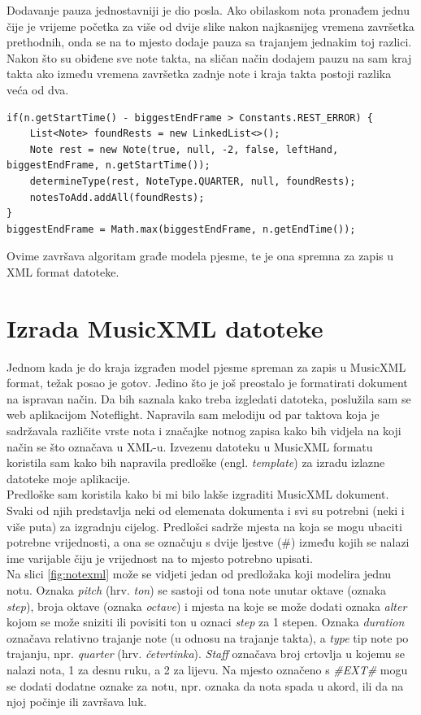 \documentclass[times, utf8, zavrsni, numeric]{fer}
\begin{document}
Dodavanje pauza jednostavniji je dio posla. Ako obilaskom nota pronađem jednu čije je vrijeme početka za više od dvije slike nakon najkasnijeg vremena završetka prethodnih, onda se na to mjesto dodaje pauza sa trajanjem jednakim toj razlici. Nakon što su obiđene sve note takta, na sličan način dodajem pauzu na sam kraj takta ako između vremena završetka zadnje note i kraja takta postoji razlika veća od dva.

\begin{lstlisting}
if(n.getStartTime() - biggestEndFrame > Constants.REST_ERROR) {
	List<Note> foundRests = new LinkedList<>();
	Note rest = new Note(true, null, -2, false, leftHand, biggestEndFrame, n.getStartTime());
	determineType(rest, NoteType.QUARTER, null, foundRests);
	notesToAdd.addAll(foundRests);
}
biggestEndFrame = Math.max(biggestEndFrame, n.getEndTime());
\end{lstlisting}

Ovime završava algoritam građe modela pjesme, te je ona spremna za zapis u XML format datoteke.

\section{Izrada MusicXML datoteke}
Jednom kada je do kraja izgrađen model pjesme spreman za zapis u MusicXML format, težak posao je gotov. Jedino što je još preostalo je formatirati dokument na ispravan način. Da bih saznala kako treba izgledati datoteka, poslužila sam se web aplikacijom Noteflight. Napravila sam melodiju od par taktova koja je sadržavala različite vrste nota i značajke notnog zapisa kako bih vidjela na koji način se što označava u XML-u. Izvezenu datoteku u MusicXML formatu koristila sam kako bih napravila predloške (engl. \textit{template}) za izradu izlazne datoteke moje aplikacije.\\

Predloške sam koristila kako bi mi bilo lakše izgraditi MusicXML dokument. Svaki od njih predstavlja neki od elemenata dokumenta i svi su potrebni (neki i više puta) za izgradnju cijelog. Predlošci sadrže mjesta na koja se mogu ubaciti potrebne vrijednosti, a ona se označuju s dvije ljestve (\#) između kojih se nalazi ime varijable čiju je vrijednost na to mjesto potrebno upisati.\\

Na slici \ref{fig:notexml} može se vidjeti jedan od predložaka koji modelira jednu notu. Oznaka \textit{pitch} (hrv. \textit{ton}) se sastoji od tona note unutar oktave (oznaka \textit{step}), broja oktave (oznaka \textit{octave}) i mjesta na koje se može dodati oznaka \textit{alter} kojom se može sniziti ili povisiti ton u oznaci \textit{step} za 1 stepen. Oznaka \textit{duration} označava relativno trajanje note (u odnosu na trajanje takta), a \textit{type} tip note po trajanju, npr. \textit{quarter} (hrv. \textit{četvrtinka}). \textit{Staff} označava broj crtovlja u kojemu se nalazi nota, 1 za desnu ruku, a 2 za lijevu. Na mjesto označeno s \textit{\#EXT\#} mogu se dodati dodatne oznake za notu, npr. oznaka da nota spada u akord, ili da na njoj počinje ili završava luk.
\end{document}
